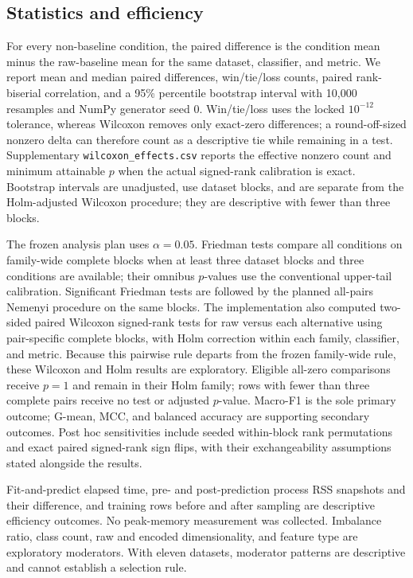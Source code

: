 \documentclass[10pt]{article}
\begin{document}
\subsection{Statistics and efficiency}

For every non-baseline condition, the paired difference is the condition mean minus the raw-baseline mean for the same dataset, classifier, and metric. We report mean and median paired differences, win/tie/loss counts, paired rank-biserial correlation, and a 95\% percentile bootstrap interval with 10,000 resamples and NumPy generator seed 0. Win/tie/loss uses the locked $10^{-12}$ tolerance, whereas Wilcoxon removes only exact-zero differences; a round-off-sized nonzero delta can therefore count as a descriptive tie while remaining in a test. Supplementary \texttt{wilcoxon\_effects.csv} reports the effective nonzero count and minimum attainable $p$ when the actual signed-rank calibration is exact. Bootstrap intervals are unadjusted, use dataset blocks, and are separate from the Holm-adjusted Wilcoxon procedure; they are descriptive with fewer than three blocks.

The frozen analysis plan uses $\alpha=0.05$. Friedman tests \citep{friedman1937use} compare all conditions on family-wide complete blocks when at least three dataset blocks and three conditions are available; their omnibus $p$-values use the conventional upper-tail calibration. Significant Friedman tests are followed by the planned all-pairs Nemenyi procedure \citep{nemenyi1963distribution} on the same blocks. The implementation also computed two-sided paired Wilcoxon signed-rank tests \citep{wilcoxon1945individual} for raw versus each alternative using pair-specific complete blocks, with Holm correction within each family, classifier, and metric. Because this pairwise rule departs from the frozen family-wide rule, these Wilcoxon and Holm results are exploratory. Eligible all-zero comparisons receive $p=1$ and remain in their Holm family; rows with fewer than three complete pairs receive no test or adjusted $p$-value. Macro-F1 is the sole primary outcome; G-mean, MCC, and balanced accuracy are supporting secondary outcomes. Post hoc sensitivities include seeded within-block rank permutations and exact paired signed-rank sign flips, with their exchangeability assumptions stated alongside the results.

Fit-and-predict elapsed time, pre- and post-prediction process RSS snapshots and their difference, and training rows before and after sampling are descriptive efficiency outcomes. No peak-memory measurement was collected. Imbalance ratio, class count, raw and encoded dimensionality, and feature type are exploratory moderators. With eleven datasets, moderator patterns are descriptive and cannot establish a selection rule.
\end{document}
